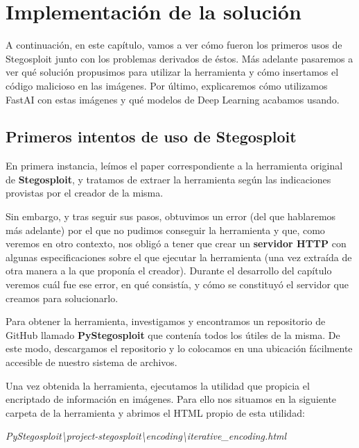 \chapter{Implementación de la solución}
\label{ch:stego}

A continuación, en este capítulo, vamos a ver cómo fueron los primeros usos de Stegosploit junto con los problemas derivados de éstos. Más adelante pasaremos a ver qué solución propusimos para utilizar la herramienta y cómo insertamos el código malicioso en las imágenes. Por último, explicaremos cómo utilizamos FastAI con estas imágenes y qué modelos de Deep Learning acabamos usando. %

\section{Primeros intentos de uso de Stegosploit}
\label{sec:stego_1}

En primera instancia, leímos el paper correspondiente a la herramienta original de \textbf{Stegosploit}, y tratamos de extraer la herramienta según las indicaciones provistas por el creador de la misma.

Sin embargo, y tras seguir sus pasos, obtuvimos un error (del que hablaremos más adelante) por el que no pudimos conseguir la herramienta y que, como veremos en otro contexto, nos obligó a tener que crear un \textbf{servidor HTTP} con algunas especificaciones sobre el que ejecutar la herramienta (una vez extraída de otra manera a la que proponía el creador). Durante el desarrollo del capítulo veremos cuál fue ese error, en qué consistía, y cómo se constituyó el servidor que creamos para solucionarlo.

Para obtener la herramienta, investigamos y encontramos un repositorio de GitHub llamado \textbf{PyStegosploit} que contenía todos los útiles de la misma. De este modo, descargamos el repositorio y lo colocamos en una ubicación fácilmente accesible de nuestro sistema de archivos.

Una vez obtenida la herramienta, ejecutamos la utilidad que propicia el encriptado de información en imágenes. Para ello nos situamos en la siguiente carpeta de la herramienta y abrimos el HTML propio de esta utilidad:

\begin{center}
\textit{PyStegosploit\textbackslash{project-stegosploit}\textbackslash{encoding}\textbackslash{iterative\_encoding.html}}
\end{center}

